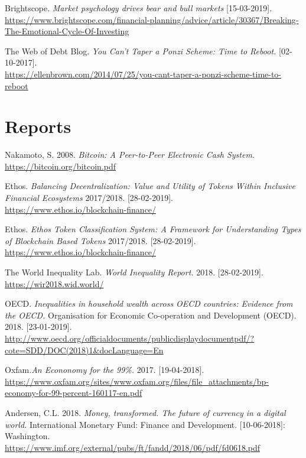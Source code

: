 \begin{thebibliography}{25}
Brightscope. \emph{ Market psychology drives bear and bull markets} [15-03-2019].\\
\url{https://www.brightscope.com/financial-planning/advice/article/30367/Breaking-The-Emotional-Cycle-Of-Investing}

 The Web of Debt Blog. \emph{You Can't Taper a Ponzi Scheme: Time to Reboot.} [02-10-2017].\\ \url{https://ellenbrown.com/2014/07/25/you-cant-taper-a-ponzi-scheme-time-to-reboot}


\section*{Reports}

Nakamoto, S. 2008. \emph{Bitcoin: A Peer-to-Peer Electronic Cash System.}\\
\url{https://bitcoin.org/bitcoin.pdf}

Ethos.
\emph{Balancing Decentralization: Value and Utility of Tokens Within Inclusive Financial Ecosystems} 2017/2018. [28-02-2019].\\
\url{https://www.ethos.io/blockchain-finance/}

Ethos.
\emph{Ethos Token Classification System: A Framework for Understanding Types of Blockchain Based Tokens} 2017/2018. [28-02-2019].\\
\url{https://www.ethos.io/blockchain-finance/}

The World Inequality Lab.
\emph{World Inequality Report.} 2018. [28-02-2019].\\
\url{https://wir2018.wid.world/}

OECD. \emph{Inequalities in household wealth across OECD countries: Evidence from the OECD.}
Organisation for Economic Co-operation and Development (OECD). 2018. [23-01-2019].\\
\url{http://www.oecd.org/officialdocuments/publicdisplaydocumentpdf/?cote=SDD/DOC(2018)1&docLanguage=En}

Oxfam.\emph{An Econonomy for the 99\%.} 2017. [19-04-2018].\\
\url{https://www.oxfam.org/sites/www.oxfam.org/files/file_attachments/bp-economy-for-99-percent-160117-en.pdf}

Andersen, C.L. 2018. \textit{Money, transformed. The future of currency in a digital world.}
International Monetary Fund: Finance and Development. [10-06-2018]: Washington.\\
\url{https://www.imf.org/external/pubs/ft/fandd/2018/06/pdf/fd0618.pdf}


\end{thebibliography}
